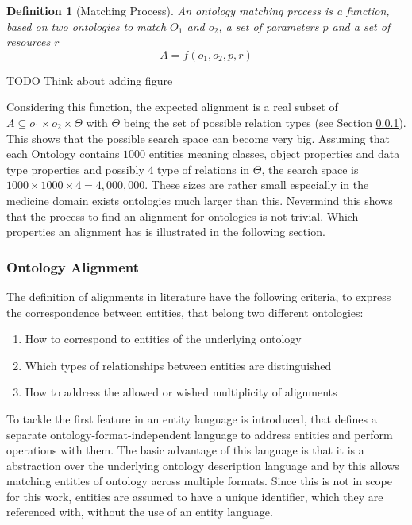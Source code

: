 \documentclass[11pt,titlepage,oneside,openany,a4paper]{report}
\newtheorem{definition}{Definition}[chapter]
\begin{document}
\begin{definition} [Matching Process]
\label{def::Matching_process}
An ontology matching process is a function, based on two ontologies to match $O_1$ and $o_2$, a set of parameters $p$ and  a set of resources $r$
\begin{equation*}
A = f (o_1, o_2, p,r)
\end{equation*}
\end{definition}

\begin{LARGE}
TODO Think about adding figure
\end{LARGE}

Considering this function, the expected alignment is a real subset of $ A \subseteq o_1 \times o_2 \times \Theta$ with $\Theta$ being the set of possible relation types (see Section \ref{sec:oa_def}). This shows that the possible search space can become very big. Assuming that each Ontology contains $1000$ entities meaning classes, object properties and data type properties and possibly 4 type of relations in $\Theta$, the  search space is $1000 \times 1000 \times 4 = 4,000,000$. These sizes are rather small especially in the medicine domain exists ontologies much larger than this.  Nevermind this shows that the process to find an alignment for ontologies is not trivial. \cite{ehrig2006ontology}
Which properties an alignment has is illustrated in the following section.

\subsubsection{Ontology Alignment}
\label{sec:oa_def}
The definition of alignments in literature have the following criteria, to express the correspondence between entities, that belong two different ontologies:
\begin{enumerate}
\item How to correspond to entities of the underlying ontology
\item Which types of relationships between entities are distinguished
\item How to address the allowed or wished multiplicity of alignments
\end{enumerate}

To tackle the first feature in \cite{euzenat2013d} an entity language is introduced, that defines a separate ontology-format-independent language to address entities and perform operations with them. The basic advantage of this language is that it is a abstraction over the underlying ontology description language and by this allows matching entities of ontology across multiple formats. Since this is not in scope for this work, entities are assumed to have a unique identifier, which they are referenced with, without the use of an entity language.
\end{document}
